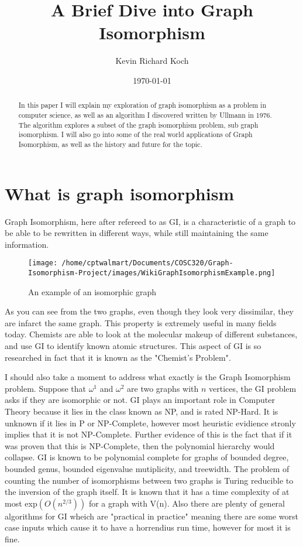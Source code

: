 \documentclass[notitlepage]{report}
\title{A Brief Dive into Graph Isomorphism}
\author{Kevin Richard Koch}
\date{\today}
\begin{document}
\maketitle
\thispagestyle{empty}

\begin{abstract}
In this paper I will explain my exploration of graph isomorphism as a problem in computer science, as well as an algorithm I discovered written by Ullmann in 1976. The algorithm explores a subset of the graph isomorphism problem, sub graph isomorphism. I will also go into some of the real world applications of Graph Isomorphism, as well as the history and future for the topic.
\end{abstract}

\section*{What is graph isomorphism}
Graph Isomorphism, here after refereed to as GI, is a characteristic of a graph to be able to be rewritten in different ways, while still maintaining the same information.
\begin{figure}[h!]
\texttt{[image: /home/cptwalmart/Documents/COSC320/Graph-Isomorphism-Project/images/WikiGraphIsomorphismExample.png]}
\caption{An example of an isomorphic graph}
\end{figure}

As you can see from the two graphs, even though they look very dissimilar, they are infarct the same graph. This property is extremely useful in many fields today. Chemists are able to look at the molecular makeup of different substances, and use GI to identify known atomic structures. This aspect of GI is so researched in fact that it is known as the "Chemist's Problem".

I should also take a moment to address what exactly is the Graph Isomorphism problem. Suppose that $\omega^{1}$ and $\omega^{2}$ are two graphs with $n$ vertices, the GI problem asks if they are isomorphic or not. GI plays an important role in Computer Theory because it lies in the class known as NP, and is rated NP-Hard. It is unknown if it lies in P or NP-Complete, however most heuristic evidience stronly implies that it is not NP-Complete. Further evidence of this is the fact that if it was proven that this is NP-Complete, then the polynomial hierarchy would collapse. GI is known to be polynomial complete for graphs of bounded degree, bounded genus, bounded eigenvalue mutiplicity, and treewidth. The problem of counting the number of isomorphisms between two graphs is Turing reducible to the inversion of the graph itself. It is known that it has a time complexity of at most exp$(O(n^{2/3}))$ for a graph with V(n). Also there are plenty of general algorithms for GI wheich are "practical in practice" meaning there are some worst case inputs which cause it to have a horrendius run time, however for most it is fine.  ~\cite{derksen, hartke}
\end{document}
